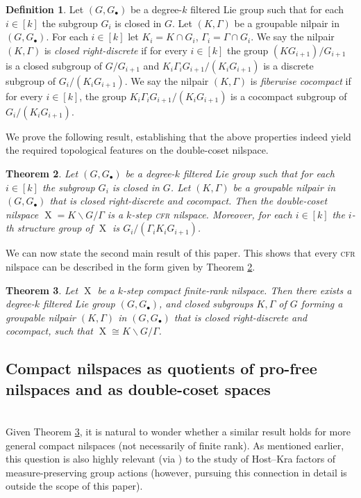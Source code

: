\documentclass[a4paper,12pt,reqno]{amsart}
\newtheorem{theorem}{Theorem}[section]
\theoremstyle{definition}
\newtheorem{defn}[theorem]{Definition}
\DeclareMathOperator{\ns}{X}
\begin{document}
\begin{defn}\label{def:CRDCnilpair}
Let $(G,G_\bullet)$ be a degree-$k$ filtered Lie group such that for each $i\in[k]$ the subgroup $G_i$ is closed in $G$. Let $(K,\Gamma)$ be a groupable nilpair in $(G,G_\bullet)$. For each $i\in [k]$ let $K_i=K\cap G_i$, $\Gamma_i=\Gamma\cap G_i$. We say the nilpair $(K,\Gamma)$ is \emph{closed right-discrete} if for every $i\in[k]$ the group $(KG_{i+1})/G_{i+1}$ is a closed subgroup of $G/G_{i+1}$ and $K_i \Gamma_i G_{i+1} /(K_iG_{i+1})$ is a discrete subgroup of $G_i/(K_iG_{i+1})$. We say the nilpair $(K,\Gamma)$ is \emph{fiberwise cocompact} if for every $i\in[k]$, the group $K_i\Gamma_iG_{i+1}/(K_iG_{i+1})$ is a cocompact subgroup of $G_i/(K_iG_{i+1})$.
\end{defn}
\noindent We prove the following result, establishing that the above properties indeed yield the required topological features on the double-coset nilspace.
\begin{theorem}\label{thm:suffDC}
Let $(G,G_\bullet)$ be a degree-$k$ filtered Lie group such that for each $i\in [k]$ the subgroup $G_i$ is closed in $G$. Let $(K,\Gamma)$ be a groupable nilpair in $(G,G_\bullet)$ that is closed right-discrete and cocompact. Then the double-coset nilspace $\ns=K\backslash G/\Gamma$ is a $k$-step \textsc{cfr} nilspace. Moreover, for each $i\in [k]$ the $i$-th structure group of $\ns$ is $G_i/(\Gamma_i K_i G_{i+1})$.
\end{theorem}

\noindent We can now state the second main result of this paper. This shows that every \textsc{cfr} nilspace can be described in the form given by Theorem \ref{thm:suffDC}.
\begin{theorem}\label{thm:cfr=double-coset-intro}
Let $\ns$ be a $k$-step compact finite-rank nilspace. Then there exists a degree-$k$ filtered Lie group $(G,G_\bullet)$, and closed subgroups $K,\Gamma$ of $G$ forming a groupable nilpair $(K,\Gamma)$ in $(G,G_\bullet)$ that is closed right-discrete and cocompact, such that $\ns\cong K\backslash G/\Gamma$.
\end{theorem}

\subsection{Compact nilspaces as quotients of pro-free nilspaces and as double-coset spaces}\label{subsec:introCompExt}\hfill\\
Given Theorem \ref{thm:cfr=double-coset-intro}, it is  natural to wonder whether a similar result holds for more general compact nilspaces (not necessarily of finite rank). As mentioned earlier, this question is also highly relevant (via \cite[Theorem 5.11]{CScouplings}) to the study of Host--Kra factors of measure-preserving group actions (however, pursuing this  connection in detail is outside the scope of this paper).  
\end{document}
